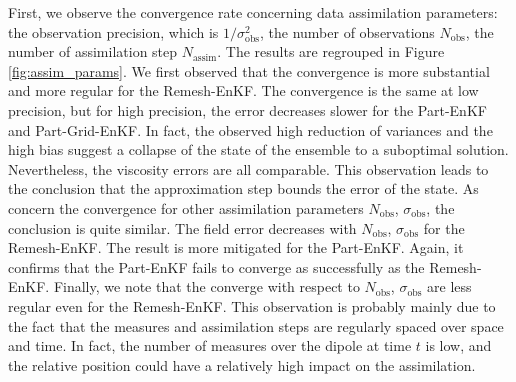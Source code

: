 First, we observe the convergence rate concerning data assimilation parameters: the observation precision, which is \(1/\sigma_{\text{obs}}^2\), the number of observations \(N_{\text{obs}}\), the number of assimilation step \(N_{\text{assim}}\).
The results are regrouped in Figure \ref{fig:assim_params}. We first observed that the convergence is more substantial and more regular for the Remesh-EnKF. The convergence is the same at low precision, but for high precision, the error decreases slower for the Part-EnKF and Part-Grid-EnKF. In fact, the observed high reduction of variances and the high bias suggest a collapse of the state of the ensemble to a suboptimal solution. Nevertheless, the viscosity errors are all comparable. This observation leads to the conclusion that the approximation step bounds the error of the state.
As concern the convergence for other assimilation parameters \(N_{\text{obs}}\), \(\sigma_{\text{obs}}\), the conclusion is quite similar. The field error decreases with \(N_{\text{obs}}\), \(\sigma_{\text{obs}}\) for the Remesh-EnKF. The result is more mitigated for the Part-EnKF. Again, it confirms that the Part-EnKF fails to converge as successfully as the Remesh-EnKF.
Finally, we note that the converge with respect to \(N_{\text{obs}}\), \(\sigma_{\text{obs}}\) are less regular even for the Remesh-EnKF. This observation is probably mainly due to the fact that the measures and assimilation steps are regularly spaced over space and time. In fact, the number of measures over the dipole at time $t$ is low, and the relative position could have a relatively high impact on the assimilation.


